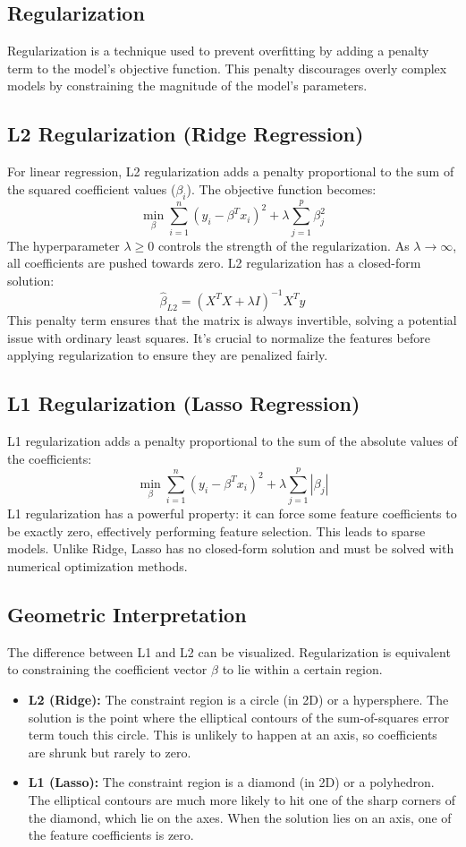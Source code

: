 \documentclass{article}
\begin{document}
\begin{multicols}{2}
	\section{Regularization}
	Regularization is a technique used to prevent overfitting by adding a penalty term to the model's objective function. This penalty discourages overly complex models by constraining the magnitude of the model's parameters.

	\subsection{L2 Regularization (Ridge Regression)}
	For linear regression, L2 regularization adds a penalty proportional to the sum of the squared coefficient values ($\beta_i$). The objective function becomes:
	$$ \min_{\beta} \sum_{i=1}^{n} (y_i - \beta^T x_i)^2 + \lambda \sum_{j=1}^{p} \beta_j^2 $$
	The hyperparameter $\lambda \ge 0$ controls the strength of the regularization. As $\lambda \to \infty$, all coefficients are pushed towards zero. L2 regularization has a closed-form solution:
	$$ \hat{\beta}_{L2} = (X^T X + \lambda I)^{-1} X^T y $$
	This penalty term ensures that the matrix is always invertible, solving a potential issue with ordinary least squares. It's crucial to normalize the features before applying regularization to ensure they are penalized fairly.

	\subsection{L1 Regularization (Lasso Regression)}
	L1 regularization adds a penalty proportional to the sum of the absolute values of the coefficients:
	$$ \min_{\beta} \sum_{i=1}^{n} (y_i - \beta^T x_i)^2 + \lambda \sum_{j=1}^{p} |\beta_j| $$
	L1 regularization has a powerful property: it can force some feature coefficients to be exactly zero, effectively performing feature selection. This leads to sparse models. Unlike Ridge, Lasso has no closed-form solution and must be solved with numerical optimization methods.

	\subsection{Geometric Interpretation}
	The difference between L1 and L2 can be visualized. Regularization is equivalent to constraining the coefficient vector $\beta$ to lie within a certain region.
	\begin{itemize}
		\item \textbf{L2 (Ridge):} The constraint region is a circle (in 2D) or a hypersphere. The solution is the point where the elliptical contours of the sum-of-squares error term touch this circle. This is unlikely to happen at an axis, so coefficients are shrunk but rarely to zero.
		\item \textbf{L1 (Lasso):} The constraint region is a diamond (in 2D) or a polyhedron. The elliptical contours are much more likely to hit one of the sharp corners of the diamond, which lie on the axes. When the solution lies on an axis, one of the feature coefficients is zero.
	\end{itemize}


\end{multicols}
\end{document}
